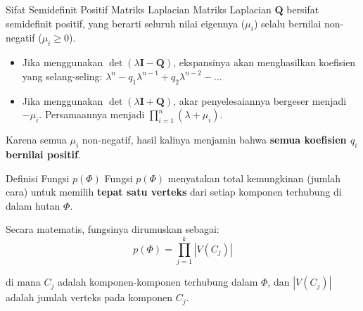 \documentclass[aspectratio=169]{beamer}
\begin{document}
\begin{frame}{Sifat Semidefinit Positif Matriks Laplacian}
  Matriks Laplacian $\mathbf{Q}$ bersifat semidefinit positif, yang berarti seluruh nilai eigennya ($\mu_i$) selalu bernilai non-negatif ($\mu_i \geqslant 0$).

  \begin{itemize}
    \item Jika menggunakan $\det(\lambda \mathbf{I} - \mathbf{Q})$, ekspansinya akan menghasilkan koefisien yang selang-seling: $\lambda^n - q_1 \lambda^{n-1} + q_2 \lambda^{n-2} - \dots$
    \item Jika menggunakan $\det(\lambda \mathbf{I} + \mathbf{Q})$, akar penyelesaiannya bergeser menjadi $-\mu_i$. Persamaannya menjadi $\prod_{i=1}^n (\lambda + \mu_i)$.
  \end{itemize}

  Karena semua $\mu_i$ non-negatif, hasil kalinya menjamin bahwa \textbf{semua koefisien $q_i$ bernilai positif}.
\end{frame}

\begin{frame}{Definisi Fungsi $p(\Phi)$}
  Fungsi $p(\Phi)$ menyatakan total kemungkinan (jumlah cara) untuk memilih \textbf{tepat satu verteks} dari setiap komponen terhubung di dalam hutan $\Phi$.

  \vspace{0.5cm}
  Secara matematis, fungsinya dirumuskan sebagai:
  $$ p(\Phi) = \prod_{j=1}^k |V(C_j)| $$

  di mana $C_j$ adalah komponen-komponen terhubung dalam $\Phi$, dan $|V(C_j)|$ adalah jumlah verteks pada komponen $C_j$.
\end{frame}
\end{document}

